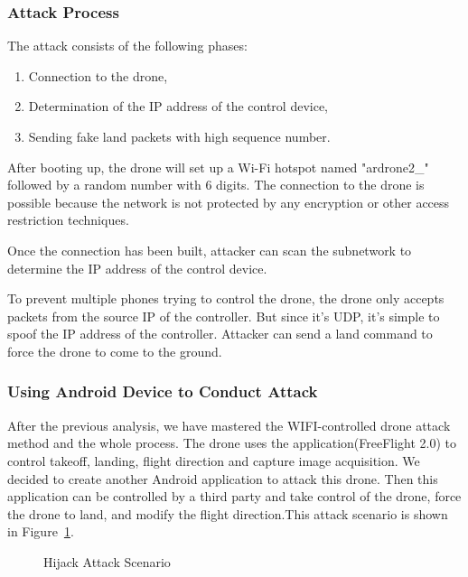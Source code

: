 \documentclass{acm_proc_article-sp}
\begin{document}
\subsubsection{Attack Process}

The attack consists of the following phases:

\begin{enumerate}
  \item Connection to the drone,
  \item Determination of the IP address of the control device,
  \item Sending fake land packets with high sequence number.
\end{enumerate}

After booting up, the drone will set up a Wi-Fi hotspot named "ardrone2\_" followed by a random number with 6 digits. The connection to the drone is possible because the network is not protected by any encryption or other access restriction techniques.

Once the connection has been built, attacker can scan the subnetwork to determine the IP address of the control device.

To prevent multiple phones trying to control the drone, the drone only accepts packets from the source IP of the controller. But since it's UDP, it's simple to spoof the IP address of the controller. Attacker can send a land command to force the drone to come to the ground.\cite{drone:python} 



\subsubsection{Using Android Device to Conduct Attack}

After the previous analysis, we have mastered the WIFI-controlled drone attack method and the whole process. The drone uses the application(FreeFlight 2.0) to control takeoff, landing, flight direction and capture image acquisition. We decided to create another Android application to attack this drone. Then this application can be controlled by a third party and take control of the drone, force the drone to land, and modify the flight direction.This attack scenario is shown in Figure~\ref{hijack}.

\begin{figure}
\centering
{}
\caption{Hijack Attack Scenario}
\label{hijack}
\end{figure}
\end{document}
